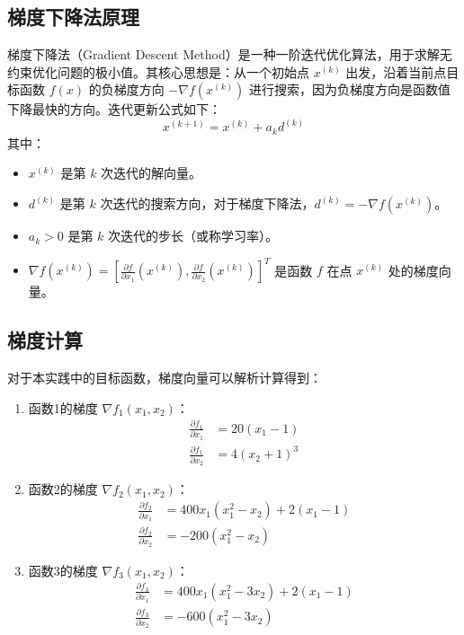 \documentclass[12pt]{article} %
\begin{document}
\subsection{梯度下降法原理}
梯度下降法（Gradient Descent Method）是一种一阶迭代优化算法，用于求解无约束优化问题的极小值。其核心思想是：从一个初始点 \(x^{(k)}\) 出发，沿着当前点目标函数 \(f(x)\) 的负梯度方向 \(-\nabla f(x^{(k)})\) 进行搜索，因为负梯度方向是函数值下降最快的方向。迭代更新公式如下：
\begin{equation}
    x^{(k+1)} = x^{(k)} + a_k d^{(k)}
    \label{eq:gd_update}
\end{equation}
其中：
\begin{itemize}
    \item \(x^{(k)}\) 是第 \(k\) 次迭代的解向量。
    \item \(d^{(k)}\) 是第 \(k\) 次迭代的搜索方向，对于梯度下降法，\(d^{(k)} = - \nabla f(x^{(k)})\)。
    \item \(a_k > 0\) 是第 \(k\) 次迭代的步长（或称学习率）。
    \item \(\nabla f(x^{(k)}) = \left[ \frac{\partial f}{\partial x_1}(x^{(k)}), \frac{\partial f}{\partial x_2}(x^{(k)}) \right]^T\) 是函数 \(f\) 在点 \(x^{(k)}\) 处的梯度向量。
\end{itemize}

\subsection{梯度计算}
对于本实践中的目标函数，梯度向量可以解析计算得到：
\begin{enumerate}
    \item 函数1的梯度 \(\nabla f_1(x_1, x_2)\)：
    \begin{align*}
        \frac{\partial f_1}{\partial x_1} &= 20(x_1-1) \\
        \frac{\partial f_1}{\partial x_2} &= 4(x_2+1)^3
    \end{align*}
    \item 函数2的梯度 \(\nabla f_2(x_1, x_2)\)：
    \begin{align*}
        \frac{\partial f_2}{\partial x_1} &= 400x_1(x_1^2-x_2) + 2(x_1-1) \\
        \frac{\partial f_2}{\partial x_2} &= -200(x_1^2-x_2)
    \end{align*}
    \item 函数3的梯度 \(\nabla f_3(x_1, x_2)\)：
    \begin{align*}
        \frac{\partial f_3}{\partial x_1} &= 400x_1(x_1^2-3x_2) + 2(x_1-1) \\
        \frac{\partial f_3}{\partial x_2} &= -600(x_1^2-3x_2)
    \end{align*}
\end{enumerate}
\end{document}
